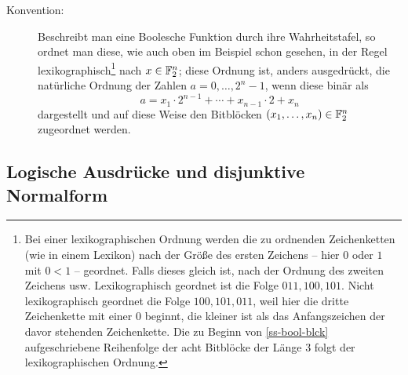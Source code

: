 \begin{refsegment}
\begin{description}
   \item[Konvention:] Beschreibt man eine Boolesche Funktion durch ihre
      Wahrheitstafel, so ordnet man diese, wie auch oben im Beispiel
      schon gesehen, in der Regel lexikographisch\footnote{%
        Bei einer lexikographischen Ordnung
        werden die zu ordnenden
        Zeichenketten (wie in einem Lexikon) nach der Größe des ersten
        Zeichens -- hier $0$ oder $1$ mit $0 < 1$ -- geordnet.
        Falls dieses gleich ist, nach der Ordnung des zweiten Zeichens
        usw. Lexikographisch geordnet ist die Folge $011,100,101$. Nicht
        lexikographisch geordnet die Folge $100,101,011$, weil hier die
        dritte Zeichenkette mit einer $0$ beginnt, die kleiner ist als das
        Anfangszeichen der davor stehenden Zeichenkette. Die zu Beginn
        von \ref{ss-bool-blck} aufgeschriebene Reihenfolge der acht
        Bitblöcke der Länge $3$ folgt der lexikographischen Ordnung.
      } nach $x \in \mathbb{F}_2^n$;
      diese Ordnung ist, anders ausgedrückt, die natürliche Ordnung der
      Zahlen $a = 0, \ldots, 2^n-1$, wenn diese binär als
\[
     a = x_1\cdot 2^{n-1} + \cdots + x_{n-1}\cdot 2 + x_n
\]
      dargestellt und auf diese Weise den Bitblöcken
      $(x_1,\ldots,x_n) \in \mathbb{F}_2^n$ zugeordnet werden.
\end{description}

\subsection{Logische Ausdrücke und disjunktive Normalform}\label{ss-bool-dnf}


\end{refsegment}
